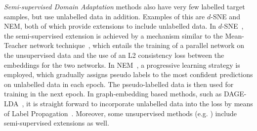 \documentclass[journal]{IEEEtran}
\begin{document}
\textit{Semi-supervised Domain Adaptation} methods also have very few labelled target samples, but use unlabelled data in addition. Examples of this are $d$-SNE and NEM, both of which provide extensions to include unlabelled data. 
In $d$-SNE~\cite{xu2019dsne}, the semi-supervised extension is achieved by a mechanism similar to the Mean-Teacher network technique~\cite{tarvainen2017mean}, which entails the training of a parallel network on the unsupervised data and the use of an L2 consistency loss between the embeddings for the two networks.
In NEM~\cite{wang2019nem}, a progressive learning strategy is employed, which gradually assigns pseudo labels to the most confident predictions on unlabelled data in each epoch. The pseudo-labelled data is then used for training in the next epoch.
In graph-embedding based methods, such as DAGE-LDA~\cite{hedegaard2020supervised}, it is straight forward to incorporate unlabelled data into the loss by means of Label Propagation~\cite{zhu2003semi, weston2008deep}.
Moreover, some unsupervised methods (e.g. \cite{li2019locality, chen2020domain}) include semi-supervised extensions as well.
\end{document}
